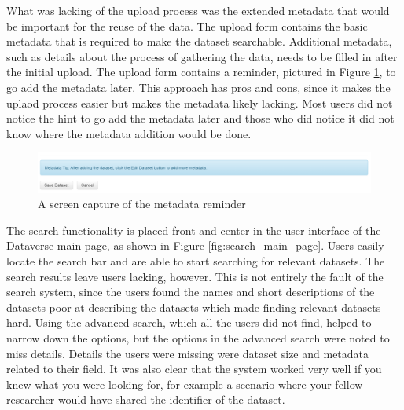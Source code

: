 What was lacking of the upload process was the extended metadata that would be
important for the reuse of the data. The upload form contains the basic
metadata that is required to make the dataset searchable. Additional metadata,
such as details about the process of gathering the data, needs to be filled in
after the initial upload. The upload form contains a reminder, pictured in
Figure \ref{fig:hint}, to go add the metadata later. This approach has pros and
cons, since it makes the uplaod process easier but makes the metadata likely
lacking. Most users did not notice the hint to go add the metadata later and
those who did notice it did not know where the metadata addition would be done.

\begin{figure}
    \begin{centering}
        \includegraphics[width=\textwidth]{images/hint}
    \end{centering}
    \caption{A screen capture of the metadata reminder}
    \label{fig:hint}
\end{figure}

The search functionality is placed front and center in the user interface of
the Dataverse main page, as shown in Figure \ref{fig:search_main_page}. Users
easily locate the search bar and are able to start searching for relevant
datasets. The search results leave users lacking, however. This is not entirely
the fault of the search system, since the users found the names and short
descriptions of the datasets poor at describing the datasets which made
finding relevant datasets hard. Using the advanced search, which all the users
did not find, helped to narrow down the options, but the options in the
advanced search were noted to miss details. Details the users were missing
were dataset size and metadata related to their field. It was also clear that
the system worked very well if you knew what you were looking for, for example
a scenario where your fellow researcher would have shared the identifier of
the dataset.

